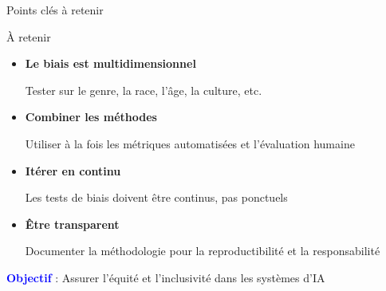 \begin{frame}{Points clés à retenir}

    \begin{block}{À retenir}
        \medskip
        \begin{itemize}
            \item<+-> \textbf{Le biais est multidimensionnel}

            Tester sur le genre, la race, l'âge, la culture, etc.

            \item<+-> \textbf{Combiner les méthodes}

            Utiliser à la fois les métriques automatisées et l'évaluation humaine

            \item<+-> \textbf{Itérer en continu}

            Les tests de biais doivent être continus, pas ponctuels

            \item<+-> \textbf{Être transparent}

            Documenter la méthodologie pour la reproductibilité et la responsabilité
        \end{itemize}
    \end{block}

    \bigskip

    \begin{overprint}
        \centering
        \textcolor{blue}{\textbf{Objectif}} : Assurer l'équité et l'inclusivité dans les systèmes d'IA
    \end{overprint}

\end{frame}
